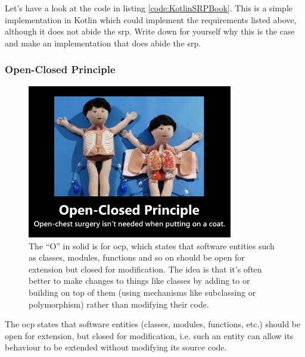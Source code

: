 \begin{exercise}
Let's have a look at the code in listing \ref{code:KotlinSRPBook}.
This is a simple implementation in Kotlin which could implement the requirements listed above, although it does not abide the \gls{srp}.
Write down for yourself why this is the case and make an implementation that does abide the \gls{srp}.
\end{exercise}



\subsubsection{Open-Closed Principle}

\begin{figure}
	\centering
	\includegraphics[width=0.8\textwidth]{images/kotlin/OCP.jpg}
	\caption{The “O” in \gls{solid} is for \gls{ocp}, which states that software entities such as classes, modules, functions and so on should be open for extension but closed for modification.
		The idea is that it’s often better to make changes to things like classes by adding to or building on top of them (using mechanisms like subclassing or polymorphism) rather than modifying their code.}
	\label{fir:OCP}
\end{figure}


\begin{framed}
	The \gls{ocp} states that software entities (classes, modules, functions, etc.) should be open for extension, but closed for modification, i.e. such an entity can allow its behaviour to be extended without modifying its source code.
\end{framed}

